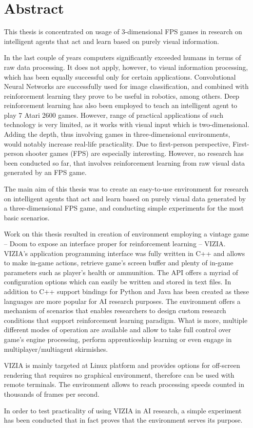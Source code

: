 \chapter*{Abstract}

This thesis is concentrated on usage of 3-dimensional FPS games in research on intelligent agents that act and learn based on purely visual information.


In the last couple of years computers significantly exceeded humans in terms of raw data processing.
It does not apply, however, to visual information processing, which has been equally successful only for certain applications.
Convolutional Neural Networks are successfully used for image classification, and combined with reinforcement learning they prove to be useful in robotics, among others.
Deep reinforcement learning has also been employed to teach an intelligent agent to play 7 Atari 2600 games.
However, range of practical applications of such technology is very limited, as it works with visual input which is two-dimensional.
Adding the depth, thus involving games in three-dimensional environments, would notably increase real-life practicality.
Due to first-person perspective, First-person shooter games (FPS) are especially interesting. However, no research has been conducted so far, that involves reinforcement learning from raw visual data generated by an FPS game.

The main aim of this thesis was to create an easy-to-use environment for research on intelligent agents that act and learn based on purely visual data generated by a three-dimensional FPS game, and conducting simple experiments for the most basic scenarios.


Work on this thesis resulted in creation of environment employing a vintage game -- Doom to expose an interface proper for reinforcement learning -- VIZIA. VIZIA's application programming interface was fully written in C++ and allows to make in-game actions, retrieve game's screen buffer and plenty of in-game parameters such as player's health or ammunition. 
The API offers a myriad of configuration options which can easily be written and stored in text files.
In addition to C++ support bindings for Python and Java has been created as these languages are more popular for AI research purposes. 
The environment offers a mechanism of scenarios that enables researchers to design custom research conditions that support reinforcement learning paradigm.
What is more, multiple different modes of operation are available and allow to take full control over game's engine processing, perform apprenticeship learning or even engage in multiplayer/multiagent skirmishes. 

VIZIA is mainly targeted at Linux platform and provides options for off-screen rendering that requires no graphical environment, therefore can be used with remote terminals.
The environment allows to reach processing speeds counted in thousands of frames per second.

In order to test practicality of using VIZIA in AI research, a simple experiment has been conducted that in fact proves that the environment serves its purpose.
